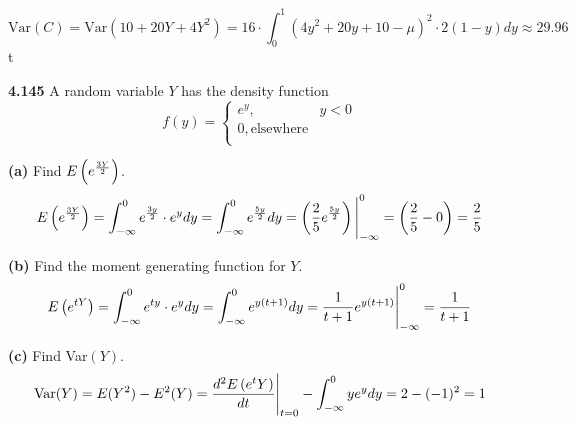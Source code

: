 \documentclass{exam}
\begin{document}
\begin{questions}
$$\text{Var}(C) = \text{Var}(10 + 20Y + 4Y^2) = 16 \cdot \int_0^1 (4y^2 + 20y + 10- \mu)^2 \cdot 2(1 - y)dy \approx 29.96$$t

\newpage
\textbf{4.145 }
A random variable $Y$ has the density function
$$f(y) =
\begin{cases}
    e^y, & y < 0 \\
    0, \text{elsewhere} \\
\end{cases}$$

\newline
\textbf{(a)} Find $E\left( e^{\frac{3Y}{2}} \right)$.
\sol
$$E\left( e^{\frac{3Y}{2}} \right) = \int_{-\infty}^0 e^\frac{3y}{2} \cdot e^y dy = \int_{-\infty}^0 e^\frac{5y}{2}dy = \left( \frac{2}{5}e^\frac{5y}{2} \right)\Bigg|_{-\infty}^0 = \left( \frac{2}{5} - 0 \right) = \frac{2}{5}$$

\newline
\textbf{(b)} Find the moment generating function for $Y$.
\sol
$$E\left( e^{tY} \right) = \int_{-\infty}^0 e^{ty} \cdot e^ydy = \int_{-\infty}^0 e^{y(t + 1)}dy = \frac{1}{t + 1}e^{y(t + 1)}\Bigg|_{-\infty}^0 = \frac{1}{t + 1}$$


\newline
\textbf{(c)} Find Var$(Y)$.
\sol
$$\text{Var}(Y) = E(Y^2) - E^2(Y) = \frac{d^2E\left( e^tY \right)}{dt}\Bigg|_{t = 0} - \int_{-\infty}^0 ye^ydy = 2 - (-1)^2 = 1$$
\end{questions}
\end{document}
